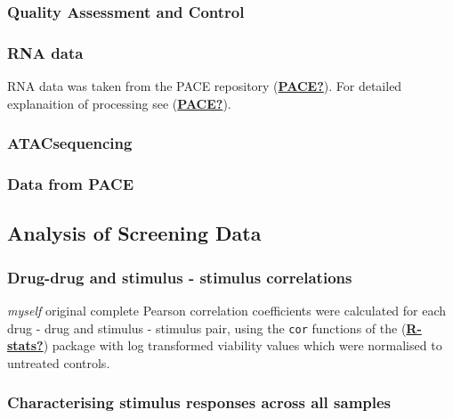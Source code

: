 \documentclass[11pt, a4paper, twosided]{book}
\begin{document}
\hypertarget{quality-assessment-and-control}{%
\subsubsection{Quality Assessment and Control}\label{quality-assessment-and-control}}

\hypertarget{rna-data}{%
\subsubsection{RNA data}\label{rna-data}}

RNA data was taken from the PACE repository (\protect\hyperlink{ref-PACE}{\textbf{PACE?}}). For detailed explanaition of processing see (\protect\hyperlink{ref-PACE}{\textbf{PACE?}}).

\hypertarget{atacsequencing-1}{%
\subsubsection{ATACsequencing}\label{atacsequencing-1}}

\hypertarget{data-from-pace}{%
\subsubsection{Data from PACE}\label{data-from-pace}}

\hypertarget{analysis-of-screening-data}{%
\subsection{Analysis of Screening Data}\label{analysis-of-screening-data}}

\hypertarget{drug-drug-and-stimulus---stimulus-correlations}{%
\subsubsection{Drug-drug and stimulus - stimulus correlations}\label{drug-drug-and-stimulus---stimulus-correlations}}

\emph{myself} original complete
Pearson correlation coefficients were calculated for each drug - drug and stimulus - stimulus pair, using the \texttt{cor} functions of the (\protect\hyperlink{ref-R-stats}{\textbf{R-stats?}}) package with log transformed viability values which were normalised to untreated controls.

\hypertarget{characterising-stimulus-responses-across-all-samples}{%
\subsubsection{Characterising stimulus responses across all samples}\label{characterising-stimulus-responses-across-all-samples}}
\end{document}
